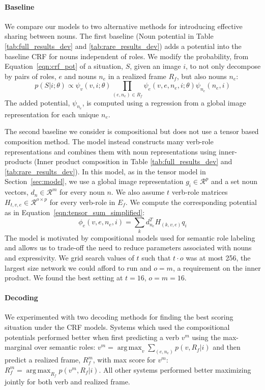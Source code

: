 \documentclass[10pt,twocolumn,letterpaper]{article}
\DeclareMathOperator*{\argmax}{arg\,max}
\begin{document}
\paragraph{Baseline}
We compare our models to two alternative methods for introducing effective sharing between nouns.
The first baseline (Noun potential in Table \ref{tab:full_results_dev} and \ref{tab:rare_results_dev}) adds a potential into the baseline CRF for nouns independent of roles.
We modify the probability, from Equation~\ref{eqn:crf_pot} of a situation, $S$, given an image $i$, to not only decompose by pairs of roles, $e$ and nouns $n_e$ in a realized frame $R_f$, but also nouns $n_e$:   
\begin{equation}
p(S |i; \theta) \propto \psi_v(v,i; \theta)\prod_{(e,n_e) \in R_f} \psi_e(v,e,n_e,i; \theta)\psi_{n_e}(n_e,i)
\label{eqn:crf_pot2}
\end{equation}
The added potential, $\psi_{n_e}$, is computed using a regression from a global image representation for each unique $n_e$.  

The second baseline we consider is compositional but does not use a tensor based composition method.
The model instead constructs many verb-role representations and combines them with noun representations using inner-products (Inner product composition in Table \ref{tab:full_results_dev} and \ref{tab:rare_results_dev}). 
In this model, as in the tensor model in Section~\ref{sec:model}, we use a global image representation $g_i \in \mathcal{R}^p$ and a set noun vectors, $d_n \in \mathcal{R}^m$ for every noun $n$.  
We also assume $t$ verb-role matrices $H_{t,v,e} \in \mathcal{R}^{o \times p}$ for every verb-role in $E_f$.
We compute the corresponding potential as in Equation~\ref{eqn:tensor_sum_simplified}:
\begin{equation}
\phi_e(v,e,n_e,i) = \sum_{k} d_{n_e}^{T}H_{(k,v,e)}q_i
\label{eqn:tensor_sum_simplified}
\end{equation}
The model is motivated by compositional models used for semantic role labeling~\cite{fitz_srl} and allows us to trade-off the need to reduce parameters associated with nouns and expressivity. 
We grid search values of $t$ such that $t \cdot o $ was at most 256, the largest size network we could afford to run and $o = m$, a requirement on the inner product. We found the best setting at $t = 16$, $o = m = 16$. 



\paragraph{Decoding}
We experimented with two decoding methods for finding the best scoring situation under the CRF models. 
Systems which used the compositional potentials performed better when first predicting a verb $v^m$ using the max-marginal over semantic roles:
$v^{m} = \argmax_v\sum_{(e,n_e)} p(v, R_f | i)$
and then predict a realized frame, $R_f^{m}$, with max score for $v^m$:
$R_f^{m} = \argmax_{R_f} p(v^{m}, R_f | i ) $.
All other systems performed better maximizing jointly for both verb and realized frame.
\end{document}
